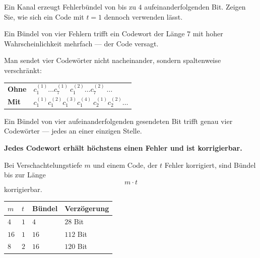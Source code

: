 \begin{aufgabe}
Ein Kanal erzeugt Fehlerbündel von bis zu $4$ aufeinanderfolgenden Bit. Zeigen Sie, wie sich ein Code mit $t=1$ dennoch verwenden lässt.

\loesung
{}
Ein Bündel von vier Fehlern trifft ein Codewort der Länge $7$ mit hoher Wahrscheinlichkeit mehrfach --- der Code versagt.

Man sendet vier Codewörter nicht nacheinander, sondern spaltenweise verschränkt:

\begin{center}
{\small
\renewcommand{\arraystretch}{1.5}
\begin{tabular}{@{}P{2.0cm}P{5.4cm}@{}}
\toprule
\textbf{Ohne} & $c^{(1)}_1\ldots c^{(1)}_7\ c^{(2)}_1\ldots c^{(2)}_7\ \ldots$\\
\textbf{Mit} & $c^{(1)}_1 c^{(2)}_1 c^{(3)}_1 c^{(4)}_1\ c^{(1)}_2 c^{(2)}_2 \ldots$\\
\bottomrule
\end{tabular}}
\end{center}

Ein Bündel von vier aufeinanderfolgenden gesendeten Bit trifft genau vier  Codewörter --- jedes an einer einzigen Stelle.

\begin{center}
\begin{minipage}{0.9\textwidth}
\textbf{Jedes Codewort erhält höchstens einen Fehler und ist korrigierbar.}
\end{minipage}
\end{center}

Bei Verschachtelungstiefe $m$ und einem Code, der $t$ Fehler korrigiert, sind Bündel bis zur Länge
\[ m \cdot t \]
korrigierbar.

\begin{center}
\renewcommand{\arraystretch}{1.48}
\begin{tabular}{@{}P{1.6cm}P{1.6cm}P{2.2cm}P{2.2cm}@{}}
\toprule
$m$ & $t$ & \textbf{Bündel} & \textbf{Verzögerung}\\
\midrule
$4$ & $1$ & $4$ & $28$ Bit\\
$16$ & $1$ & $16$ & $112$ Bit\\
$8$ & $2$ & $16$ & $120$ Bit\\
\bottomrule
\end{tabular}
\end{center}


\end{aufgabe}
